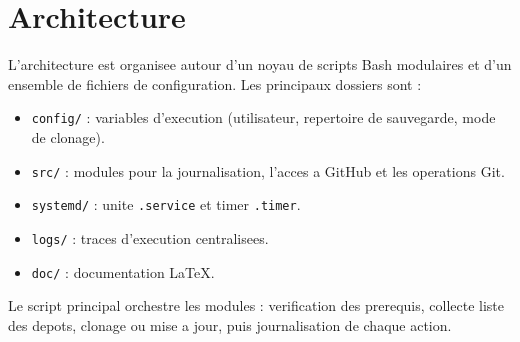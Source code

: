 \section{Architecture}
L'architecture est organisee autour d'un noyau de scripts Bash modulaires et d'un
ensemble de fichiers de configuration. Les principaux dossiers sont :

\begin{itemize}
  \item \texttt{config/} : variables d'execution (utilisateur, repertoire de
  sauvegarde, mode de clonage).
  \item \texttt{src/} : modules pour la journalisation, l'acces a GitHub et les
  operations Git.
  \item \texttt{systemd/} : unite \texttt{.service} et timer \texttt{.timer}.
  \item \texttt{logs/} : traces d'execution centralisees.
  \item \texttt{doc/} : documentation LaTeX.
\end{itemize}

Le script principal orchestre les modules : verification des prerequis, collecte
liste des depots, clonage ou mise a jour, puis journalisation de chaque action.
